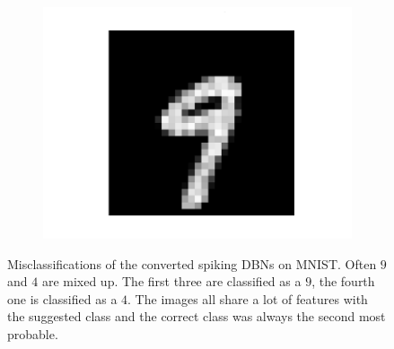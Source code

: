 \begin{figure}[h!]
\begin{subfigure}{.24\textwidth}
  		\centering
  		\includegraphics[width=0.6\linewidth]{imgs/convert/err/err3.png}
  		\label{fig:sub1}
	\end{subfigure}%
	
	
	\caption[Misclassifications of the converted spiking DBNs on MNIST.]{Misclassifications of the converted spiking DBNs on MNIST. Often $9$ and $4$ are mixed up. The first three are classified as a $9$, the fourth one is classified as a $4$. The images all share a lot of features with the suggested class and the correct class was always the second most probable.}
	\label{fig:mismnisthum}
\end{figure}


